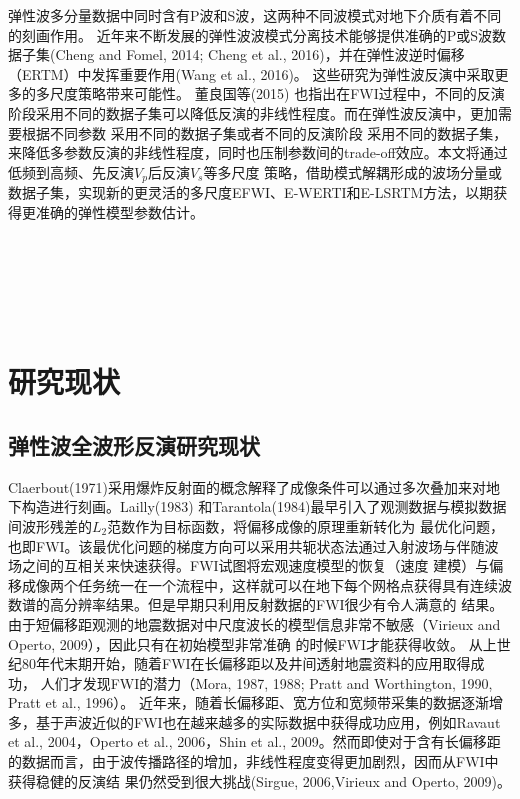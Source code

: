 弹性波多分量数据中同时含有P波和S波，这两种不同波模式对地下介质有着不同的刻画作用。
近年来不断发展的弹性波波模式分离技术能够提供准确的P或S波数据子集(Cheng and Fomel,
2014\cite{cheng:2014b}; Cheng et al.,
2016\cite{cheng:2016})，并在弹性波逆时偏移（ERTM）中发挥重要作用(Wang et al.,
2016\cite{wang2016scalar})。
这些研究为弹性波反演中采取更多的多尺度策略带来可能性。
董良国等(2015)\cite{董良国2015}
也指出在FWI过程中，不同的反演阶段采用不同的数据子集可以降低反演的非线性程度。而在弹性波反演中，更加需要根据不同参数
采用不同的数据子集或者不同的反演阶段
采用不同的数据子集，来降低多参数反演的非线性程度，同时也压制参数间的trade-off效应。本文将通过低频到高频、先反演$V_p$后反演$V_s$等多尺度
策略，借助模式解耦形成的波场分量或数据子集，实现新的更灵活的多尺度EFWI、E-WERTI和E-LSRTM方法，以期获得更准确的弹性模型参数估计。

$\quad$

$\quad$

$\quad$
\section{研究现状}
\subsection{弹性波全波形反演研究现状}
Claerbout(1971\cite{Claerbout1971})采用爆炸反射面的概念解释了成像条件可以通过多次叠加来对地下构造进行刻画。Lailly(1983\cite{lailly1983seismic})
和Tarantola(1984\cite{tarantola1984})最早引入了观测数据与模拟数据间波形残差的$L_2$范数作为目标函数，将偏移成像的原理重新转化为
最优化问题，也即FWI。该最优化问题的梯度方向可以采用共轭状态法通过入射波场与伴随波场之间的互相关来快速获得。FWI试图将宏观速度模型的恢复（速度
建模）与偏移成像两个任务统一在一个流程中，这样就可以在地下每个网格点获得具有连续波数谱的高分辨率结果。但是早期只利用反射数据的FWI很少有令人满意的
结果。由于短偏移距观测的地震数据对中尺度波长的模型信息非常不敏感（Virieux and Operto,
2009\cite{virieux2009overview}），因此只有在初始模型非常准确
的时候FWI才能获得收敛。
从上世纪80年代末期开始，随着FWI在长偏移距以及井间透射地震资料的应用取得成功，
人们才发现FWI的潜力（Mora, 1987\cite{mora:1987}, 1988\cite{mora1988elastic}; Pratt
and Worthington, 1990\cite{PRATTEtAl1990}, Pratt et al., 1996\cite{pratt1996two}）。
近年来，随着长偏移距、宽方位和宽频带采集的数据逐渐增多，基于声波近似的FWI也在越来越多的实际数据中获得成功应用，例如Ravaut
et al., 2004\cite{RavautEtAl2004}，Operto et al., 2006\cite{Operto2006}，Shin et al.,
2009\cite{ShinEtAl2009}。然而即使对于含有长偏移距的数据而言，由于波传播路径的增加，非线性程度变得更加剧烈，因而从FWI中获得稳健的反演结
果仍然受到很大挑战(Sirgue, 2006\cite{sirgue2006importance},Virieux and Operto,
2009\cite{virieux2009overview})。

